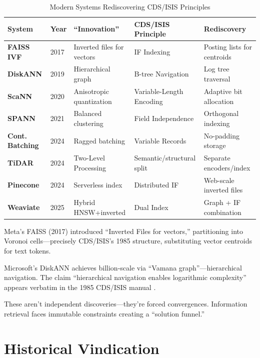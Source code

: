 \documentclass[manuscript,screen,nonacm]{acmart}
\begin{document}
\begin{table}[h]
\centering
\caption{Modern Systems Rediscovering CDS/ISIS Principles}
\label{tab:convergence}
\begin{tabular}{p{} p{} p{} p{} p{}}
\toprule
\textbf{System} & \textbf{Year} & \textbf{``Innovation''} & \textbf{CDS/ISIS Principle} & \textbf{Rediscovery} \\
\midrule
\textbf{FAISS IVF} \cite{johnson2017} & 2017 & Inverted files for vectors & IF Indexing & Posting lists for centroids \\
\textbf{DiskANN} \cite{subramanya2019} & 2019 & Hierarchical graph & B-tree Navigation & Log tree traversal \\
\textbf{ScaNN} \cite{guo2020} & 2020 & Anisotropic quantization & Variable-Length Encoding & Adaptive bit allocation \\
\textbf{SPANN} \cite{chen2021} & 2021 & Balanced clustering & Field Independence & Orthogonal indexing \\
\textbf{Cont. Batching} \cite{reboul2025} & 2024 & Ragged batching & Variable Records & No-padding storage \\
\textbf{TiDAR} \cite{liu2024} & 2024 & Two-Level Processing & Semantic/structural split & Separate encoders/index \\
\textbf{Pinecone} \cite{pinecone2024} & 2024 & Serverless index & Distributed IF & Web-scale inverted files \\
\textbf{Weaviate} \cite{weaviate2025} & 2025 & Hybrid HNSW+inverted & Dual Index & Graph + IF combination \\
\bottomrule
\end{tabular}
\end{table}

Meta's FAISS (2017) introduced ``Inverted Files for vectors,'' partitioning into Voronoi cells---precisely CDS/ISIS's 1985 structure, substituting vector centroids for text tokens.

Microsoft's DiskANN achieves billion-scale via ``Vamana graph''---hierarchical navigation. The claim ``hierarchical navigation enables logarithmic complexity'' appears verbatim in the 1985 CDS/ISIS manual \cite{unesco1989}.

These aren't independent discoveries---they're forced convergences. Information retrieval faces immutable constraints creating a ``solution funnel.''

\section{Historical Vindication}
\end{document}
